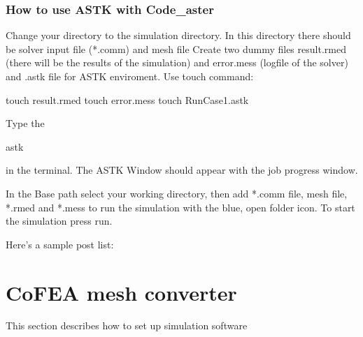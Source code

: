 \documentclass[letterpaper,10pt,english]{sphinxmanual}
\let\sphinxpxdimen\pdfpxdimen\else\newdimen\sphinxpxdimen
\begin{document}
\subsubsection{How to use ASTK with Code\_aster}
\label{\detokenize{software_setup/code_aster:how-to-use-astk-with-code-aster}}
Change your directory to the simulation directory. In this directory there should be solver input file (*.comm) and mesh file  Create two dummy files result.rmed (there will be the results of the simulation) and error.mess (logfile of the solver) and .astk file for ASTK enviroment. Use touch command:

\begin{sphinxVerbatim}[commandchars=\\\{\}]
touch result.rmed
touch error.mess
touch RunCase\PYGZus{}1.astk
\end{sphinxVerbatim}

Type the

\begin{sphinxVerbatim}[commandchars=\\\{\}]
astk
\end{sphinxVerbatim}

in the terminal. The ASTK Window should appear with the job progress window.

\begin{figure}[htbp]
\centering

\noindent\sphinxincludegraphics[width=450\sphinxpxdimen]{{first}.png}
\end{figure}

In the Base path select your working directory, then add *.comm file, mesh file, *.rmed and *.mess to run the simulation with the blue, open folder icon. To start the simulation press run.

\begin{figure}[htbp]
\centering

\noindent\sphinxincludegraphics[width=450\sphinxpxdimen]{{second}.png}
\end{figure}

Here’s a sample post list:
\begin{itemize}
\end{itemize}


\section{CoFEA mesh converter}
\label{\detokenize{pyCofea/index:cofea-mesh-converter}}\label{\detokenize{pyCofea/index::doc}}
This section describes how to set up simulation software
\end{document}
